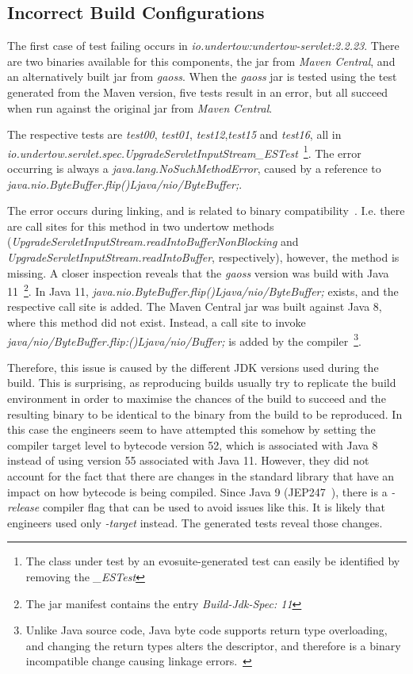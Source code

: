 \documentclass[conference]{IEEEtran}
\begin{document}
\subsection{Incorrect Build Configurations}


The first case of test failing occurs in \textit{io.undertow:undertow-servlet:2.2.23}. There are two binaries available for this components, the jar from \textit{Maven Central}, and an alternatively built jar from \textit{gaoss}. When the  \textit{gaoss} jar is tested using the test generated from the Maven version, five tests result in an error, but all succeed when run against the original jar from \textit{Maven Central}.

The respective tests are \textit{test00}, \textit{test01}, \textit{test12},\textit{test15} and \textit{test16}, all in \textit{io.under\-tow.\-servlet.\-spec.UpgradeServletInputStream\_ESTest}~\footnote{The class under test by an evosuite-generated test can easily be identified by removing the \textit{\_ESTest}}. The error occurring is always a \textit{java.lang.NoSuchMethodError}, caused by a reference to \textit{java.nio.ByteBuffer.flip()Ljava/nio/ByteBuffer;}.

The error occurs during linking, and is related to binary compatibility~\cite{JVM17Spec}. I.e. there are call sites for this method in two undertow methods (\textit{UpgradeServletInputStream.readIntoBufferNonBlocking} and \textit{UpgradeServletInputStream.readIntoBuffer}, respectively), however, the method is missing. 
A closer inspection reveals that the \textit{gaoss} version was build with Java 11~\footnote{The jar manifest contains the entry \textit{Build-Jdk-Spec: 11}}. In Java 11, \textit{java.nio.ByteBuffer.flip()Ljava/nio/ByteBuffer;} exists, and the respective call site is added. The Maven Central jar was built against Java 8, where this method did not exist.  Instead, a call site to invoke \textit{java/nio/ByteBuffer.flip:()Ljava/nio/Buffer;} is added by the compiler~\footnote{Unlike Java source code, Java byte code supports return type overloading, and changing the return types alters the descriptor, and therefore is a binary incompatible change causing linkage errors.~\cite{JVM17Spec,dietrich2014broken}}.

Therefore, this issue is caused by the different JDK versions used during the build. This is surprising, as reproducing builds usually try to replicate the build environment in order to maximise the chances of the build to succeed and the resulting binary to be identical to the binary from the build to be reproduced. In this case the engineers seem to have attempted this somehow by setting the compiler target level to bytecode version 52, which is associated with Java 8~\cite[Sect. 4.1]{JVM17Spec} instead of using version 55 associated with Java 11.  However, they did not account for the fact that there are changes in the standard library that have an impact on how bytecode is being compiled. Since Java 9 (JEP247~\cite{jep247}), there is a \textit{-release} compiler  flag that can be used to avoid issues like this. It is likely that engineers used only \textit{-target} instead. The generated tests reveal those changes.  
\end{document}
